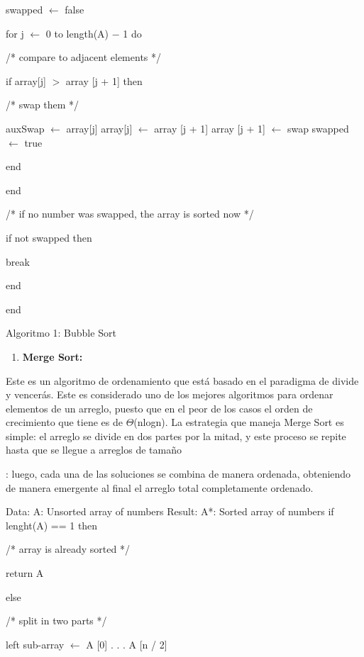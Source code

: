 ﻿\documentclass{article} %
\begin{document}
\noindent swapped $\mathrm{\leftarrow}$ false

\noindent for j $\mathrm{\leftarrow}$ 0 to length(A) $\mathrm{-}$ 1 do

\noindent /* compare to adjacent elements */

\noindent if array[j] $\mathrm{>}$ array [j + 1] then

\noindent /* swap them */

\noindent auxSwap $\mathrm{\leftarrow}$ array[j] array[j] $\mathrm{\leftarrow}$ array [j + 1] array [j + 1] $\mathrm{\leftarrow}$ swap swapped $\mathrm{\leftarrow}$ true

\noindent end

\noindent end

\noindent /* if no number was swapped, the array is sorted now */

\noindent if not swapped then

\noindent break

\noindent end

\noindent end

\noindent Algoritmo 1: Bubble Sort

\noindent 

\begin{enumerate}
\item  \textbf{Merge Sort:}
\end{enumerate}

Este es un algoritmo de ordenamiento que est\'{a} basado en el paradigma de divide y vencer\'{a}s. Este es considerado uno de los mejores algoritmos para ordenar elementos de un arreglo, puesto que en el peor de los casos el orden de crecimiento que tiene es de $\Theta$(nlogn). La estrategia que maneja Merge Sort es simple:  el arreglo se divide en dos partes por la mitad, y este proceso se repite hasta que se llegue a arreglos de tama\~{n}o

: luego, cada una de las soluciones se combina de manera ordenada, obteniendo de manera emergente al final el arreglo total completamente ordenado.

\noindent Data: A: Unsorted array of numbers Result:  A*: Sorted array of numbers if lenght(A) == 1 then

\noindent /* array is already sorted */

\noindent return A

\noindent else

\noindent /* split in two parts */

\noindent left sub-array $\mathrm{\leftarrow}$ A [0] . . . A [n / 2]
\end{document}

